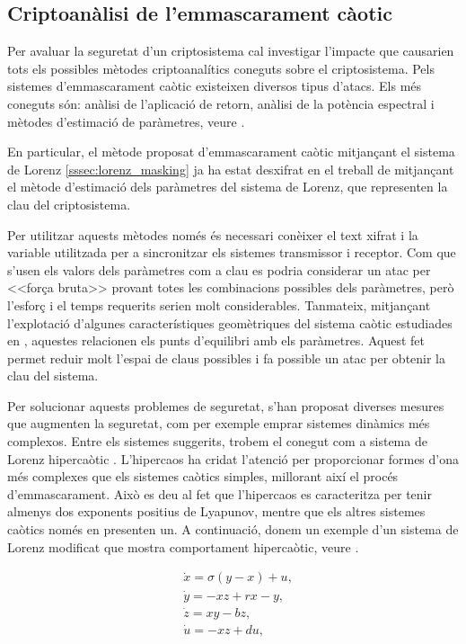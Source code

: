 \documentclass[11pt,a4paper,openright,oneside]{article}
\numberwithin{equation}{section}
\theoremstyle{definition}
\begin{document}
\subsection{Criptoanàlisi de l'emmascarament càotic}

Per avaluar la seguretat d'un criptosistema cal investigar l'impacte que causarien tots els possibles mètodes criptoanalítics coneguts sobre el criptosistema. Pels sistemes d'emmascarament caòtic existeixen diversos tipus d'atacs. Els més coneguts són: anàlisi de l'aplicació de retorn, anàlisi de la potència espectral i mètodes d'estimació de paràmetres, veure \cite{Alvarez}.

En particular, el mètode proposat d'emmascarament caòtic mitjançant el sistema de Lorenz \ref{sssec:lorenz_masking} ja ha estat desxifrat en el treball de \cite{Alvarez} mitjançant el mètode d'estimació dels paràmetres del sistema de Lorenz, que representen la clau del criptosistema.

Per utilitzar aquests mètodes només és necessari conèixer el text xifrat i la variable utilitzada per a sincronitzar els sistemes transmissor i receptor. Com que s'usen els valors dels paràmetres com a clau es podria considerar un atac per <<força bruta>> provant totes les combinacions possibles dels paràmetres, però l'esforç i el temps requerits serien molt considerables. Tanmateix, mitjançant l'explotació d'algunes característiques geomètriques del sistema caòtic estudiades en \cite{Alvarez}, aquestes relacionen els punts d'equilibri amb els paràmetres. Aquest fet permet reduir molt l'espai de claus possibles i fa possible un atac per obtenir la clau del sistema.

Per solucionar aquests problemes de seguretat, s'han proposat diverses mesures que augmenten la seguretat, com per exemple emprar sistemes dinàmics més complexos. Entre els sistemes suggerits, trobem el conegut com a sistema de Lorenz hipercaòtic \cite{Hipercaos}. L'hipercaos ha cridat l'atenció per proporcionar formes d'ona més complexes que els sistemes caòtics simples, millorant així el procés d'emmascarament. Això es deu al fet que l'hipercaos es caracteritza per tenir almenys dos exponents positius de Lyapunov, mentre que els altres sistemes caòtics només en presenten un. A continuació, donem un exemple d'un sistema de Lorenz modificat que mostra comportament hipercaòtic, veure \cite{lor_hipercaotic}.

\begin{equation} \begin{aligned} \label{eq:hipercaos}
    &\dot{x} = \sigma(y-x)+u, \\
    &\dot{y} = -xz + rx -y, \\
    &\dot{z} = xy - bz, \\
    &\dot{u} = -xz + du, 
\end{aligned} \end{equation}
\end{document}
